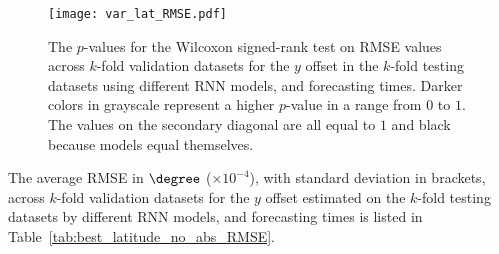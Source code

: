\begin{figure}[!ht]
	\centering
	\texttt{[image: var\_lat\_RMSE.pdf]}
	\caption{The $p$-values for the Wilcoxon signed-rank test on RMSE values across $k$-fold validation datasets for the $y$ offset in the $k$-fold testing datasets using different RNN models, and forecasting times. Darker colors in grayscale represent a higher $p$-value in a range from $0$ to $1$. The values on the secondary diagonal are all equal to $1$ and black because models equal themselves.}
	\label{fig:var_lat_RMSE}
\end{figure}

The average RMSE in $\degree$ ($\times 10^{-4}$), with standard deviation in brackets, across $k$-fold validation datasets for the $y$ offset estimated on the $k$-fold testing datasets by different RNN models, and forecasting times is listed in Table~\ref{tab:best_latitude_no_abs_RMSE}.

\begin{table}[!ht]
	\centering
	\caption{The average RMSE in $\degree$ ($\times 10^{-4}$), with standard deviation in brackets, across $k$-fold validation datasets for the $y$ offset estimated on the $k$-fold testing datasets by different RNN models, and forecasting times.}
	\label{tab:best_latitude_no_abs_RMSE}
\end{table}

